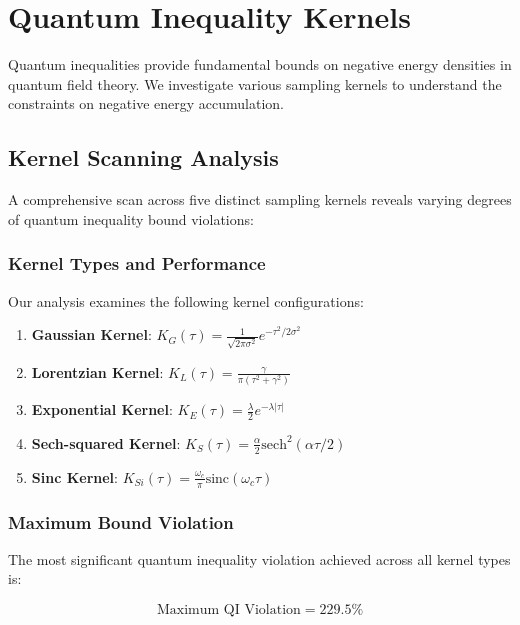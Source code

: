 \section{Quantum Inequality Kernels}

Quantum inequalities provide fundamental bounds on negative energy densities in quantum field theory. We investigate various sampling kernels to understand the constraints on negative energy accumulation.

\subsection{Kernel Scanning Analysis}

A comprehensive scan across five distinct sampling kernels reveals varying degrees of quantum inequality bound violations:

\subsubsection{Kernel Types and Performance}

Our analysis examines the following kernel configurations:

\begin{enumerate}
\item \textbf{Gaussian Kernel}: $K_G(\tau) = \frac{1}{\sqrt{2\pi\sigma^2}}e^{-\tau^2/2\sigma^2}$
\item \textbf{Lorentzian Kernel}: $K_L(\tau) = \frac{\gamma}{\pi(\tau^2 + \gamma^2)}$
\item \textbf{Exponential Kernel}: $K_E(\tau) = \frac{\lambda}{2}e^{-\lambda|\tau|}$
\item \textbf{Sech-squared Kernel}: $K_S(\tau) = \frac{\alpha}{2}\text{sech}^2(\alpha\tau/2)$
\item \textbf{Sinc Kernel}: $K_{Si}(\tau) = \frac{\omega_c}{\pi}\text{sinc}(\omega_c\tau)$
\end{enumerate}

\subsubsection{Maximum Bound Violation}

The most significant quantum inequality violation achieved across all kernel types is:

\begin{equation}
\text{Maximum QI Violation} = 229.5\%
\end{equation}

